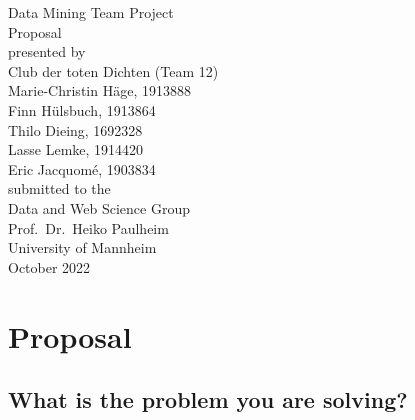 \documentclass[11pt,titlepage,oneside,openany]{book}
\begin{document}
\begin{titlepage}
	\vspace*{2cm}
  \begin{center}
   {\Large Data Mining Team Project\\}
   \vspace{2cm} 
   {Proposal\\}
   \vspace{2cm}
   {presented by\\
   	Club der toten Dichten (Team 12)\\
    Marie-Christin Häge, 1913888 \\
    Finn Hülsbuch, 1913864 \\
    Thilo Dieing, 1692328 \\
    Lasse Lemke, 1914420 \\
    Eric Jacquomé, 1903834 \\
   }
   \vspace{1cm} 
   {submitted to the\\
    Data and Web Science Group\\
    Prof.\ Dr.\ Heiko Paulheim\\
    University of Mannheim\\} \vspace{2cm}
   {October 2022}
  \end{center}
\end{titlepage} 






\newpage



\chapter{Proposal}
\section{What is the problem you are solving?}
\label{sec:problem}
\end{document}
